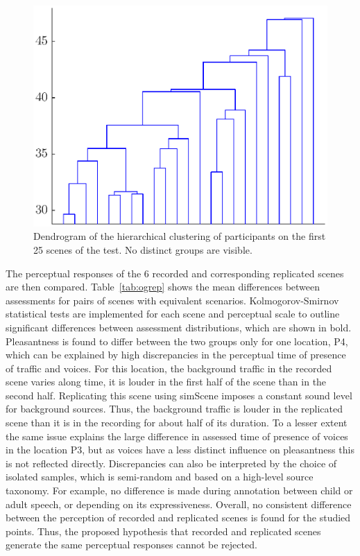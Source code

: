 \documentclass[11pt,a4paper]{article}
\begin{document}
\begin{figure}[!h]
    \centering
    \includegraphics[width=\textwidth]{figures/subj_gr.eps}
    \caption{Dendrogram of the hierarchical clustering of participants on the first 25 scenes of the test. No distinct groups are visible.}\label{fig:hclusters}
\end{figure}

The perceptual responses of the 6 recorded and corresponding replicated scenes are then compared. Table~\ref{tab:ogrep} shows the mean differences between assessments for pairs of scenes with equivalent scenarios. Kolmogorov-Smirnov statistical tests are implemented for each scene and perceptual scale to outline significant differences between assessment distributions, which are shown in bold. Pleasantness is found to differ between the two groups only for one location, P4, which can be explained by high discrepancies in the perceptual time of presence of traffic and voices. For this location, the background traffic in the recorded scene varies along time, it is louder in the first half of the scene than in the second half. Replicating this scene using simScene imposes a constant sound level for background sources. Thus, the background traffic is louder in the replicated scene than it is in the recording for about half of its duration. To a lesser extent the same issue explains the large difference in assessed time of presence of voices in the location P3, but as voices have a less distinct influence on pleasantness this is not reflected directly. Discrepancies can also be interpreted by the choice of isolated samples, which is semi-random and based on a high-level source taxonomy. For example, no difference is made during annotation between child or adult speech, or depending on its expressiveness. Overall, no consistent difference between the perception of recorded and replicated scenes is found for the studied points. Thus, the proposed hypothesis that recorded and replicated scenes generate the same perceptual responses cannot be rejected.\\
\end{document}
